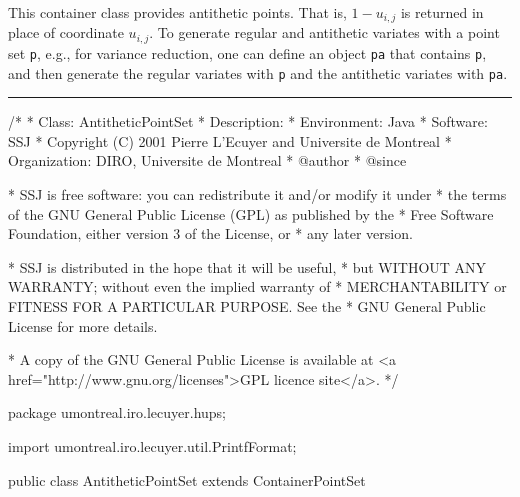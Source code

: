 
This container class provides antithetic points.
That is, $1 - u_{i,j}$ is returned in place of coordinate $u_{i,j}$.
To generate regular and antithetic variates with a point
set \texttt{p}, e.g., for variance reduction, one can define an
 object \texttt{pa} that contains \texttt{p},
and then generate the regular variates with \texttt{p} and the
antithetic variates with \texttt{pa}.



\bigskip\hrule\bigskip

\begin{code}
\begin{hide}
/*
 * Class:        AntitheticPointSet
 * Description:  
 * Environment:  Java
 * Software:     SSJ 
 * Copyright (C) 2001  Pierre L'Ecuyer and Universite de Montreal
 * Organization: DIRO, Universite de Montreal
 * @author       
 * @since

 * SSJ is free software: you can redistribute it and/or modify it under
 * the terms of the GNU General Public License (GPL) as published by the
 * Free Software Foundation, either version 3 of the License, or
 * any later version.

 * SSJ is distributed in the hope that it will be useful,
 * but WITHOUT ANY WARRANTY; without even the implied warranty of
 * MERCHANTABILITY or FITNESS FOR A PARTICULAR PURPOSE.  See the
 * GNU General Public License for more details.

 * A copy of the GNU General Public License is available at
   <a href="http://www.gnu.org/licenses">GPL licence site</a>.
 */
\end{hide}
package umontreal.iro.lecuyer.hups;\begin{hide}

import umontreal.iro.lecuyer.util.PrintfFormat;
\end{hide}

public class AntitheticPointSet extends ContainerPointSet \begin{hide} {
\end{hide}
\end{code}

